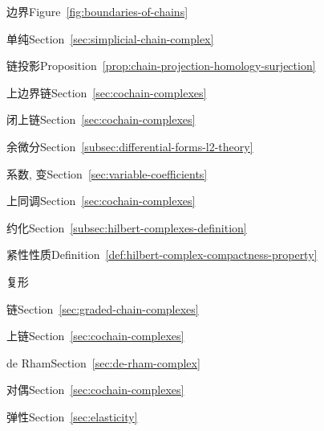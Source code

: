\begin{theindex}
\subitem {}\label{index:chain-boundary-of}{边界}\quad Figure~\ref{fig:boundaries-of-chains}

\subitem {}\label{index:chain-simplicial}{单纯}\quad Section~\ref{sec:simplicial-chain-complex}

\item {}\label{index:chain-projection}{链投影}\quad Proposition~\ref{prop:chain-projection-homology-surjection}

\item {}\label{index:coboundary}{上边界链}\quad Section~\ref{sec:cochain-complexes}

\item {}\label{index:cocycle}{闭上链}\quad Section~\ref{sec:cochain-complexes}

\item {}\label{index:codifferential}{余微分}\quad Section~\ref{subsec:differential-forms-l2-theory}

\item {}\label{index:coefficients-variable}{系数, 变}\quad Section~\ref{sec:variable-coefficients}

\item {}\label{index:cohomology}{上同调}\quad Section~\ref{sec:cochain-complexes}

\subitem {}\label{index:cohomology-reduced}{约化}\quad Section~\ref{subsec:hilbert-complexes-definition}

\item {}\label{index:compactness-property}{紧性性质}\quad Definition~\ref{def:hilbert-complex-compactness-property}

\item {}\label{index:complex}{复形}

\subitem {}\label{index:complex-chain}{链}\quad Section~\ref{sec:graded-chain-complexes}

\subitem {}\label{index:complex-cochain}{上链}\quad Section~\ref{sec:cochain-complexes}

\subitem {}\label{index:complex-de-rham}{de Rham}\quad Section~\ref{sec:de-rham-complex}

\subitem {}\label{index:complex-dual}{对偶}\quad Section~\ref{sec:cochain-complexes}

\subitem {}\label{index:complex-elasticity}{弹性}\quad Section~\ref{sec:elasticity}


\end{theindex}
